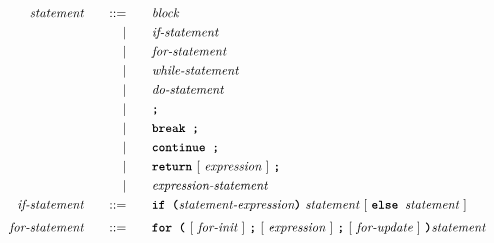 \begin{alignat*}{9}
&& \textit{statement}                      && \quad ::= & \quad && \textit{block} && \\
&&                                               &&         | & \quad && \textit{if-statement} && \\
&&                                               &&         | & \quad && \textit{for-statement} && \\
&&                                               &&         | & \quad && \textit{while-statement} && \\
&&                                               &&         | & \quad && \textit{do-statement} && \\
&&                                               &&         | & \quad && \textbf{\texttt{;}} && \\
&&                                               &&         | & \quad && \textbf{\texttt{break ;}} && \\
&&                                               &&         | & \quad && \textbf{\texttt{continue ;}} && \\
&&                                               &&         | & \quad && \textbf{\texttt{return}} \ [ \ \textit{expression} \ ] \ \textbf{\texttt{;}} && \\
&&                                               &&         | & \quad && \textit{expression-statement} && \\
&& \textit{if-statement}                         && \quad ::= & \quad && \textbf{\texttt{if (}} \textit{statement-expression} \textbf{\texttt{)}} \ \textit{statement} \ [ \ \textbf{\texttt{else }} \textit{statement} \ ]&& \\[1mm]
&& \textit{for-statement}                        && \quad ::= & \quad && \textbf{\texttt{for (}} \ [ \ \textit{for-init} \ ] \ \textbf{\texttt{;}} \ [ \ \textit{expression} \ ] \ \textbf{\texttt{;}} \ [ \ \textit{for-update} \ ] \ \textbf{\texttt{)}} \textit{statement} && \\[1mm]
\end{alignat*}
